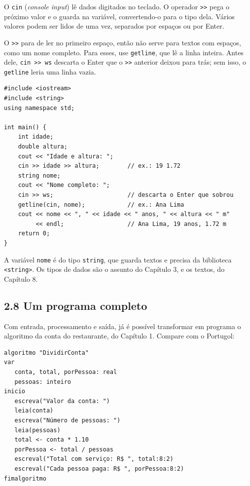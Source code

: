 O \texttt{cin} (\textit{console input}) lê dados digitados no teclado. O operador \texttt{>>} pega o próximo valor e o guarda na variável, convertendo-o para o tipo dela. Vários valores podem ser lidos de uma vez, separados por espaços ou por Enter.

O \texttt{>>} para de ler no primeiro espaço, então não serve para textos com espaços, como um nome completo. Para esses, use \texttt{getline}, que lê a linha inteira. Antes dele, \texttt{cin >> ws} descarta o Enter que o \texttt{>>} anterior deixou para trás; sem isso, o \texttt{getline} leria uma linha vazia.

\begin{codigo}
\begin{Verbatim}[breaklines=true, breaksymbolleft={}, fontsize=\footnotesize]
#include <iostream>
#include <string>
using namespace std;

int main() {
    int idade;
    double altura;
    cout << "Idade e altura: ";
    cin >> idade >> altura;        // ex.: 19 1.72
    string nome;
    cout << "Nome completo: ";
    cin >> ws;                     // descarta o Enter que sobrou
    getline(cin, nome);            // ex.: Ana Lima
    cout << nome << ", " << idade << " anos, " << altura << " m"
         << endl;                  // Ana Lima, 19 anos, 1.72 m
    return 0;
}
\end{Verbatim}
\end{codigo}

A variável \texttt{nome} é do tipo \texttt{string}, que guarda textos e precisa da biblioteca \texttt{<string>}. Os tipos de dados são o assunto do Capítulo 3, e os textos, do Capítulo 8.

\subsection{2.8 Um programa completo}

Com entrada, processamento e saída, já é possível transformar em programa o algoritmo da conta do restaurante, do Capítulo 1. Compare com o Portugol:

\begin{codigo}
\begin{Verbatim}[breaklines=true, breaksymbolleft={}, fontsize=\footnotesize]
algoritmo "DividirConta"
var
   conta, total, porPessoa: real
   pessoas: inteiro
inicio
   escreva("Valor da conta: ")
   leia(conta)
   escreva("Número de pessoas: ")
   leia(pessoas)
   total <- conta * 1.10
   porPessoa <- total / pessoas
   escreval("Total com serviço: R$ ", total:8:2)
   escreval("Cada pessoa paga: R$ ", porPessoa:8:2)
fimalgoritmo
\end{Verbatim}
\end{codigo}

